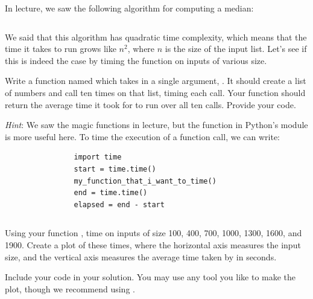 \begin{prob}

    In lecture, we saw the following algorithm for computing a median:
    \inputminted{python}{\thisdir/include/median.py}
    We said that this algorithm has quadratic time complexity, which means that the 
    time it takes to run grows like $n^2$, where $n$ is the size of the input list.
    Let's see if this is indeed the case by timing the function on inputs of various
    size.

    \begin{subprobset}
        \begin{subprob}
            Write a function named  which takes in a single
            argument, . It should create a list of  numbers
            and call  ten times on that list, timing each call.
            Your function should return the average time it took for
             to run over all ten calls. Provide your code.

            \emph{Hint}: 
            We saw the  magic functions in lecture, but 
            the  function in Python's  module is more useful
            here. To time the execution of a function call, we can write:
            \begin{verbatim}
                import time
                start = time.time()
                my_function_that_i_want_to_time()
                end = time.time()
                elapsed = end - start
            \end{verbatim}

            \begin{soln}
                 \inputminted{python}{\thisdir/include-solution/time_median.py}

            \end{soln}
        \end{subprob}

        \begin{subprob}
            Using your function , time  on inputs of
            size 100, 400, 700, 1000, 1300, 1600, and 1900. Create a plot of these times,
            where the horizontal axis measures the input size, and the vertical axis measures
            the average time taken by  in seconds.

            Include your code in your solution.
            You may use any tool you like to make the plot, though we recommend using
            .


\end{subprob}
\end{subprobset}
\end{prob}

